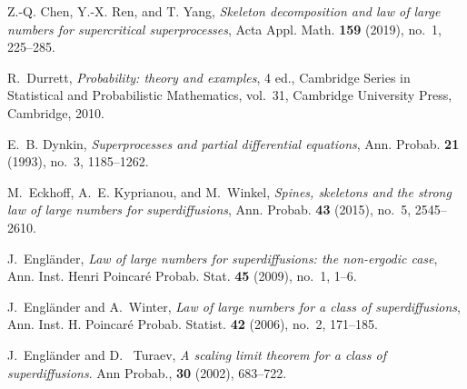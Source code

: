 \documentclass[12pt,a4paper]{amsart}
\theoremstyle{plain}
\theoremstyle{definition}
\numberwithin{equation}{section}
\begin{document}
\begin{thebibliography}{10}

  Z.-Q. Chen, Y.-X. Ren,  and T. Yang,
 \emph{Skeleton decomposition and law of large numbers for supercritical superprocesses}, Acta Appl. Math. \textbf{159} (2019), no.~1, 225--285.

R.~Durrett, \emph{Probability: theory and examples}, 4 ed., Cambridge Series in
  Statistical and Probabilistic Mathematics, vol.~31, Cambridge University
  Press, Cambridge, 2010.

E.~B. Dynkin, \emph{Superprocesses and partial differential equations}, Ann.
  Probab. \textbf{21} (1993), no.~3, 1185--1262.

M.~Eckhoff, A.~E. Kyprianou, and M.~Winkel, \emph{Spines, skeletons and the
  strong law of large numbers for superdiffusions}, Ann. Probab. \textbf{43}
  (2015), no.~5, 2545--2610.

J.~Engl\"{a}nder, \emph{Law of large numbers for superdiffusions: the
  non-ergodic case}, Ann. Inst. Henri Poincar\'{e} Probab. Stat. \textbf{45}
  (2009), no.~1, 1--6.


J.~Engl\"{a}nder and A.~Winter, \emph{Law of large numbers for a class of
  superdiffusions}, Ann. Inst. H. Poincar\'{e} Probab. Statist. \textbf{42}
  (2006), no.~2, 171--185.

J.~Engl\"{a}nder and  D. ~Turaev, \emph{A scaling limit theorem for a class of superdiffusions}. Ann Probab., \textbf{30} (2002),  683--722.




\end{thebibliography}
\end{document}

